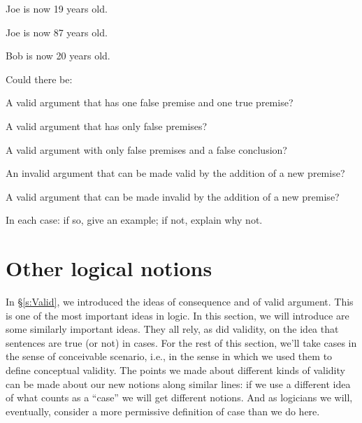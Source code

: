 \begin{earg}
\item Joe is now 19 years old.
\item Joe is now 87 years old.
\item[\therefore] Bob is now 20 years old.
\end{earg}

\problempart
\label{pr.EnglishCombinations}
Could there be:
	\begin{earg}
		\item A valid argument that has one false premise and one true premise?
		\item A valid argument that has only false premises?
		\item A valid argument with only false premises and a false conclusion?
		\item An invalid argument that can be made valid by the addition of a new premise?
		\item A valid argument that can be made invalid by the addition of a new premise?
	\end{earg}
In each case: if so, give an example; if not, explain why not.


\chapter{Other logical notions}\label{s:BasicNotions}

In \S\ref{s:Valid}, we introduced the ideas of consequence and of valid argument.  This is one of the most important ideas in logic. In this section, we will introduce are some similarly important ideas. They all rely, as did validity, on the idea that sentences are true (or not) in cases. For the rest of this section, we'll take cases in the sense of conceivable scenario, i.e., in the sense in which we used them to define conceptual validity. The points we made about different kinds of validity can be made about our new notions along similar lines: if we use a different idea of what counts as a ``case'' we will get different notions.  And as logicians we will, eventually, consider a more permissive definition of case than we do here.  


